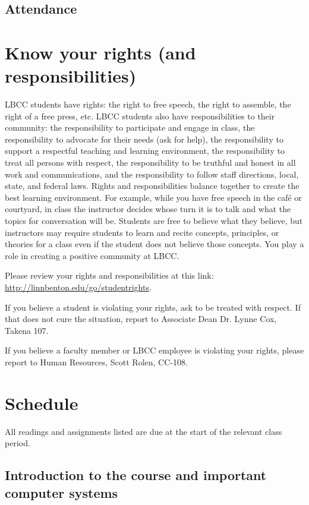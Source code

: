 \documentclass[12pt,article,oneside]{memoir}
\begin{document}
\subsection{Attendance}


\section{Know your rights (and responsibilities)}

LBCC students have rights: the right to free speech, the right to assemble, the right of a free press, etc. LBCC students also have responsibilities to their community: the responsibility to participate and engage in class, the responsibility to advocate for their needs (ask for help), the responsibility to support a respectful teaching and learning environment, the responsibility to treat all persons with respect, the responsibility to be truthful and honest in all work and communications, and the responsibility to follow staff directions, local, state, and federal laws. Rights and responsibilities balance together to create the best learning environment. For example, while you have free speech in the café or courtyard, in class the instructor decides whose turn it is to talk and what the topics for conversation will be. Students are free to believe what they believe, but instructors may require students to learn and recite concepts, principles, or theories for a class even if the student does not believe those concepts. You play a role in creating a positive community at LBCC. 

Please review your rights and responsibilities at this link: \url{http://linnbenton.edu/go/studentrights}.

If you believe a student is violating your rights, ask to be treated with respect. If that does not cure the situation, report to Associate Dean Dr. Lynne Cox, Takena 107.

If you believe a faculty member or LBCC employee is violating your rights, please report to Human Resources, Scott Rolen, CC-108.

\newpage

\section{Schedule}

All readings and assignments listed are due at the start of the relevant class period.

\subsection{Introduction to the course and important computer systems}
\end{document}
